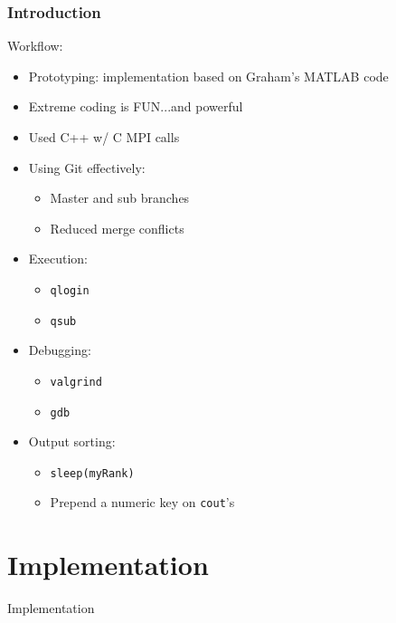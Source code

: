 \documentclass[usernames,dvipsnames]{beamer}
\begin{document}
\begin{frame}	
    \frametitle{Introduction}
    	\begin{block}{Workflow:}
    		\begin{itemize}
			\setlength\itemsep{0.5pt}
   			\item Prototyping: implementation based on Graham's MATLAB code
   			\item Extreme coding is FUN...and powerful
    			\item Used C++ w/ C MPI calls
    			\item Using Git effectively:
    				\begin{itemize}
					\setlength\itemsep{0.5pt}
    					\item Master and sub branches
    					\item Reduced merge conflicts
				\end{itemize}
    			\item Execution:
    				\begin{itemize}
					\setlength\itemsep{0.5pt}
    					\item \texttt{qlogin}
    					\item \texttt{qsub}
				\end{itemize}
    			\item Debugging:
    				\begin{itemize}
					\setlength\itemsep{0.5pt}
    					\item \texttt{valgrind}
    					\item \texttt{gdb}
				\end{itemize}
   			\item Output sorting:
    				\begin{itemize}
					\setlength\itemsep{0.5pt}
    					\item \texttt{sleep(myRank)}
    					\item Prepend a numeric key on \texttt{cout}'s
				\end{itemize}
    		\end{itemize}
    	\end{block}
\end{frame}




\section{Implementation}

\begin{frame}	
	\begin{Huge}
		\begin{center}
			Implementation
		\end{center}
	\end{Huge}
\end{frame}
\end{document}
